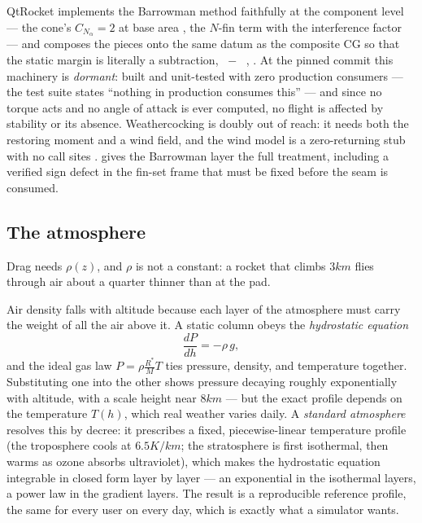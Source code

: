 QtRocket implements the Barrowman method faithfully at the component level --- the cone's
$C_{N_\alpha} = 2$ at base area , the $N$-fin term
with the interference factor  --- and composes the pieces
onto the same datum as the composite CG so that the static margin is literally a
subtraction, ~$-$~ ,
. At the pinned commit this machinery is \emph{dormant}:
built and unit-tested with zero production consumers --- the test suite states ``nothing in
production consumes this''  --- and since no torque acts
and no angle of attack is ever computed, no flight is affected by stability or its absence.
Weathercocking is doubly out of reach: it needs both the restoring moment and a wind field,
and the wind model is a zero-returning stub with no call sites .
 gives the Barrowman layer the full treatment, including a verified sign
defect in the fin-set frame that must be fixed before the seam is consumed.

\subsection{The atmosphere}\label{sec:primer-atmosphere}

Drag needs $\rho(z)$, and $\rho$ is not a constant: a rocket that climbs $3\unit{km}$ flies
through air about a quarter thinner than at the pad.

\begin{physbox}
Air density falls with altitude because each layer of the atmosphere must carry the weight
of all the air above it. A static column obeys the \emph{hydrostatic equation}
\begin{equation}
  \frac{dP}{dh} = -\rho\, g ,
\end{equation}
and the ideal gas law $P = \rho \frac{R^{*}}{M} T$ ties pressure, density, and temperature
together. Substituting one into the other shows pressure decaying roughly exponentially with
altitude, with a scale height near $8\unit{km}$ --- but the exact profile depends on the
temperature $T(h)$, which real weather varies daily. A \emph{standard atmosphere} resolves
this by decree: it prescribes a fixed, piecewise-linear temperature profile (the troposphere
cools at $6.5\unit{K/km}$; the stratosphere is first isothermal, then warms as ozone absorbs
ultraviolet), which makes the hydrostatic equation integrable in closed form layer by layer
--- an exponential in the isothermal layers, a power law in the gradient layers. The result
is a reproducible reference profile, the same for every user on every day, which is exactly
what a simulator wants.
\end{physbox}

